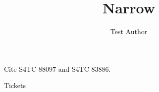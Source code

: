 \documentclass[aspectratio=43,9pt]{beamer}
\title{Narrow}
\author{Test Author}
\begin{document}
\begin{frame}{Cite}
	\acrshort{S4TC-88097} and \acrshort{S4TC-83886}.
\end{frame}
\begin{frame}[allowframebreaks]{Tickets}
	\printjiraglossary
\end{frame}
\end{document}

